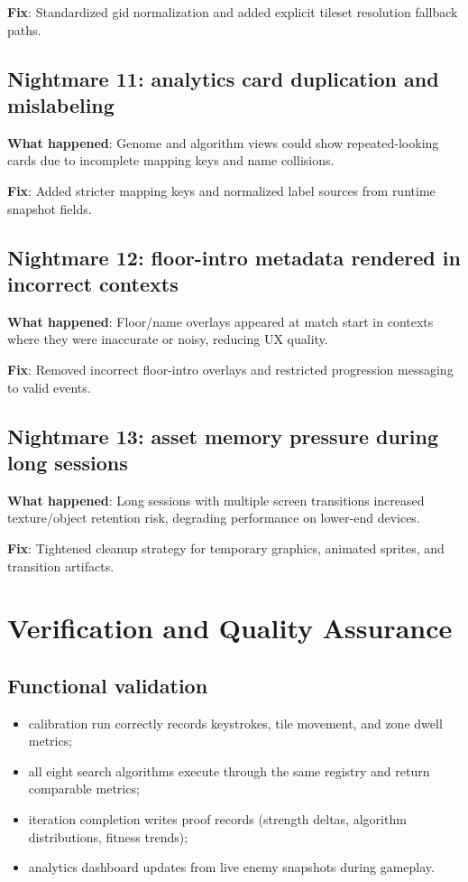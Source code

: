 \documentclass[11pt,a4paper,twoside]{article}
\begin{document}
\textbf{Fix}: Standardized gid normalization and added explicit tileset resolution fallback paths.

\subsection{Nightmare 11: analytics card duplication and mislabeling}
\textbf{What happened}: Genome and algorithm views could show repeated-looking cards due to incomplete mapping keys and name collisions.

\textbf{Fix}: Added stricter mapping keys and normalized label sources from runtime snapshot fields.

\subsection{Nightmare 12: floor-intro metadata rendered in incorrect contexts}
\textbf{What happened}: Floor/name overlays appeared at match start in contexts where they were inaccurate or noisy, reducing UX quality.

\textbf{Fix}: Removed incorrect floor-intro overlays and restricted progression messaging to valid events.

\subsection{Nightmare 13: asset memory pressure during long sessions}
\textbf{What happened}: Long sessions with multiple screen transitions increased texture/object retention risk, degrading performance on lower-end devices.

\textbf{Fix}: Tightened cleanup strategy for temporary graphics, animated sprites, and transition artifacts.

\section{Verification and Quality Assurance}

\subsection{Functional validation}
\begin{itemize}[leftmargin=6mm]
  \item calibration run correctly records keystrokes, tile movement, and zone dwell metrics;
  \item all eight search algorithms execute through the same registry and return comparable metrics;
  \item iteration completion writes proof records (strength deltas, algorithm distributions, fitness trends);
  \item analytics dashboard updates from live enemy snapshots during gameplay.
\end{itemize}
\end{document}
